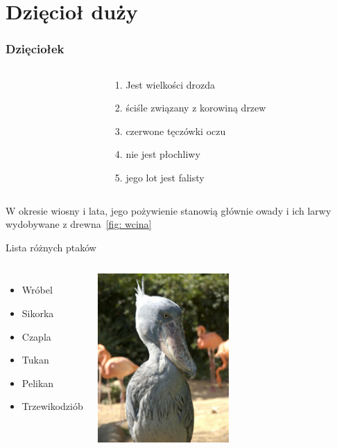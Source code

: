 \documentclass{beamer}
\begin{document}
\section{Dzięcioł duży}
	\begin{frame}
		\frametitle{Dzięciołek}
			\begin{columns}[t]
				\begin{column}{.5\textwidth}
					\\
					\newline
					\label{fig: dzieciol}
				\end{column}
				\begin{column}{.5\textwidth}
					\begin{enumerate}
						\item Jest wielkości drozda
						\item ściśle związany z korowiną drzew
						\item czerwone tęczówki oczu
						\item nie jest płochliwy
						\item jego lot jest falisty
					\end{enumerate}
				\end{column}
			\end{columns}
			W okresie wiosny i lata, jego pożywienie stanowią głównie owady i ich larwy wydobywane z drewna~\ref{fig: wcina}
	\end{frame}


\begin{frame}{Lista różnych ptaków}
\begin{columns}[T]
	\column{0.99\textwidth}
	\begin{itemize}
		\item Wróbel
		\item Sikorka
		\item Czapla
		\item Tukan
		\item Pelikan
		\item Trzewikodziób
	\end{itemize}
	
	\column{0.01\textwidth}
	\hspace*{-5cm}
	\includegraphics[width=5cm]{shoebill.jpg}
\end{columns}
\end{frame}
\end{document}
